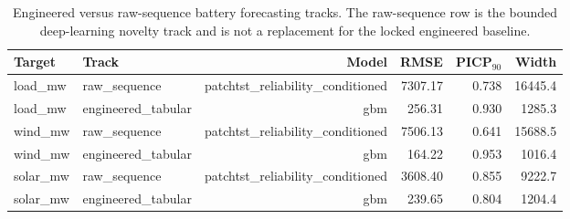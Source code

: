 \begin{table}[ht]
\centering
\caption{Engineered versus raw-sequence battery forecasting tracks. The raw-sequence row is the bounded deep-learning novelty track and is not a replacement for the locked engineered baseline.}
\label{tab:battery-raw-sequence-track}
\begin{tabular}{llrrrr}
\toprule
Target & Track & Model & RMSE & PICP$_{90}$ & Width \\
\midrule
load\_mw & raw\_sequence & patchtst\_reliability\_conditioned & 7307.17 & 0.738 & 16445.4 \\
load\_mw & engineered\_tabular & gbm & 256.31 & 0.930 & 1285.3 \\
wind\_mw & raw\_sequence & patchtst\_reliability\_conditioned & 7506.13 & 0.641 & 15688.5 \\
wind\_mw & engineered\_tabular & gbm & 164.22 & 0.953 & 1016.4 \\
solar\_mw & raw\_sequence & patchtst\_reliability\_conditioned & 3608.40 & 0.855 & 9222.7 \\
solar\_mw & engineered\_tabular & gbm & 239.65 & 0.804 & 1204.4 \\
\bottomrule
\end{tabular}
\end{table}

